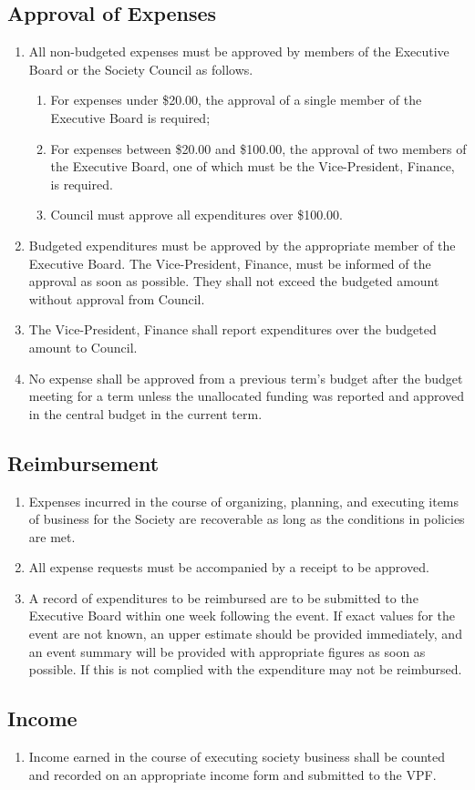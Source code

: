 \subsection{Approval of Expenses}
\begin{enumerate}
    \item All non-budgeted expenses must be approved by members of the
        Executive Board or the Society Council as follows.
        \begin{enumerate}
            \item For expenses under \$20.00, the approval of a single member
                of the Executive Board is required;
            \item For expenses between \$20.00 and \$100.00, the approval of
                two members of the Executive Board, one of which must be the
                Vice-President, Finance, is required.
            \item Council must approve all expenditures over \$100.00.
        \end{enumerate}
    \item Budgeted expenditures must be approved by the appropriate member of
        the Executive Board. The Vice-President, Finance, must be informed of
        the approval as soon as possible. They shall not exceed the budgeted
        amount without approval from Council.
    \item The Vice-President, Finance shall report expenditures over the
        budgeted amount to Council.
    \item No expense shall be approved from a previous term's budget after the
        budget meeting for a term unless the unallocated funding was reported
        and approved in the central budget in the current term.
\end{enumerate}

\subsection{Reimbursement}
\begin{enumerate}
    \item Expenses incurred in the course of organizing, planning, and
        executing items of business for the Society are recoverable as long as
        the conditions in policies are met.
    \item All expense requests must be accompanied by a receipt to be approved.
    \item A record of expenditures to be reimbursed are to be submitted to the
        Executive Board within one week following the event. If exact values
        for the event are not known, an upper estimate should be provided
        immediately, and an event summary will be provided with appropriate
        figures as soon as possible. If this is not complied with the
        expenditure may not be reimbursed.
\end{enumerate}

\subsection{Income}
\begin{enumerate}
    \item Income earned in the course of executing society business shall be
        counted and recorded on an appropriate income form and submitted to the
        VPF.
\end{enumerate}
